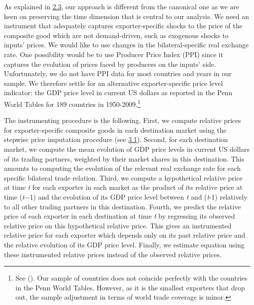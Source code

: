 \documentclass[12pt,twoside,a4paper,notitlepage]{article}
\begin{document}
{As explained in {\hyperref[ref-001]{2.3}}, our approach is different from the canonical one as we are keen on preserving the time dimension that is central to our analysis. We need an instrument that adequately captures exporter-specific shocks to the price of the composite good which are not demand-driven, such as exogenous shocks to inputs' prices. We would like to use changes in the bilateral-specific real exchange rate. One possibility would be to use Producer Price Index (PPI) since it captures the evolution of prices faced by producers on the inputs' side. Unfortunately, we do not have PPI data for most countries and years in our sample. We therefore settle for an alternative exporter-specific price level indicator: the GDP price level in current US dollars as reported in the Penn World Tables for 189 countries in 1950-2009.\footnote{See (\cite{Heston 2011}). Our sample of countries does not coincide perfectly with the countries in the Penn World Tables. However, as it is the smallest exporters that drop out, the sample adjustment in terms of world trade coverage is minor.
}

The instrumenting procedure is the following. First, we compute relative prices for exporter-specific composite goods in each destination market using the stepwise price imputation procedure (see {\hyperref[ref-004]{3.1}}). Second, for each destination market, we compute the mean evolution of GDP price levels in current US dollars of its trading partners, weighted by their market shares in this destination. This amounts to computing the evolution of the relevant real exchange rate for each specific bilateral trade relation. Third, we compute a hypothetical relative price at time \textit{t} for each exporter in each market as the product of its relative price at time (\textit{t}${-}$1) and the evolution of its GDP price level between \textit{t} and (\textit{t}-1) relatively to all other trading partners in this destination. Fourth, we predict the relative price of each exporter in each destination at time \textit{t} by regressing its observed relative price on this hypothetical relative price. This gives an instrumented relative price for each exporter which depends only on its past relative price and the relative evolution of its GDP price level. Finally, we estimate equation {\hyperref[ref-002]{ }} using these instrumented relative prices instead of the observed relative prices.

}
\end{document}
